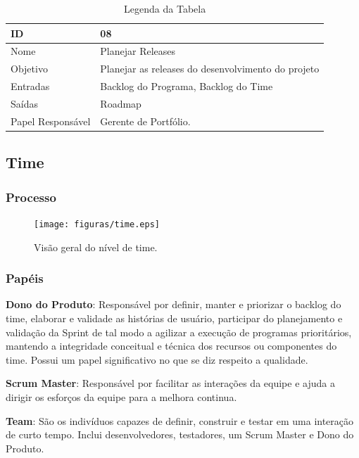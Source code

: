   \begin{table}[H]
    \centering
      \begin{tabular}{| m{5em} | m{10cm} |}
        \hline
        ID       & 08   \\ \hline
        Nome     & Planejar Releases  \\ \hline
        Objetivo & Planejar as releases do desenvolvimento do projeto \\ \hline
        Entradas & Backlog do Programa, Backlog do Time\\ \hline
        Saídas   & Roadmap \\ \hline
        Papel Responsável   & Gerente de Portfólio. \\ \hline
      \end{tabular}
      \caption{Legenda da Tabela}
      \label{tabela:atividade8}
  \end{table}

\subsection{Time}
  \subsubsection{Processo}

  \begin{figure}[H]
      \centering
    \texttt{[image: figuras/time.eps]}
      \caption{Visão geral do nível de time.}
      \label{fig:time}
  \end{figure}

  \subsubsection{Papéis}

\textbf{Dono do Produto}: Responsável por definir, manter e priorizar o backlog do time,
elaborar e validade as histórias de usuário, participar do planejamento e validação
da Sprint de tal modo a agilizar a execução de programas prioritários, mantendo a
integridade conceitual e técnica dos recursos ou componentes do time. Possui um papel
significativo no que se diz respeito a qualidade.

\textbf{Scrum Master}: Responsável por facilitar as interações da equipe e ajuda
a dirigir os esforços da equipe para a melhora continua.

\textbf{Team}: São os indivíduos capazes de definir, construir e testar em uma interação
de curto tempo. Inclui desenvolvedores, testadores, um Scrum Master e Dono do Produto.

